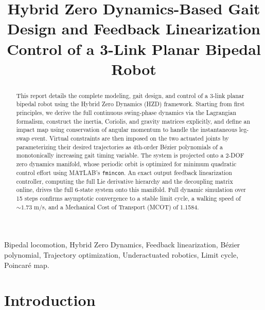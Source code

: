 \documentclass[conference]{IEEEtran}
\begin{document}
\title{Hybrid Zero Dynamics-Based Gait Design and Feedback Linearization Control of a 3-Link Planar Bipedal Robot}

\author{
}

\maketitle

\begin{abstract}
This report details the complete modeling, gait design, and control of a 3-link planar bipedal robot using the Hybrid Zero Dynamics (HZD) framework. Starting from first principles, we derive the full continuous swing-phase dynamics via the Lagrangian formalism, construct the inertia, Coriolis, and gravity matrices explicitly, and define an impact map using conservation of angular momentum to handle the instantaneous leg-swap event. Virtual constraints are then imposed on the two actuated joints by parameterizing their desired trajectories as 4th-order B\'ezier polynomials of a monotonically increasing gait timing variable. The system is projected onto a 2-DOF zero dynamics manifold, whose periodic orbit is optimized for minimum quadratic control effort using MATLAB's \texttt{fmincon}. An exact output feedback linearization controller, computing the full Lie derivative hierarchy and the decoupling matrix online, drives the full 6-state system onto this manifold. Full dynamic simulation over 15 steps confirms asymptotic convergence to a stable limit cycle, a walking speed of $\sim\!1.73$ m/s, and a Mechanical Cost of Transport (MCOT) of 1.1584.
\end{abstract}

\begin{IEEEkeywords}
Bipedal locomotion, Hybrid Zero Dynamics, Feedback linearization, B\'ezier polynomial, Trajectory optimization, Underactuated robotics, Limit cycle, Poincar\'e map.
\end{IEEEkeywords}

\section{Introduction}
\end{document}
